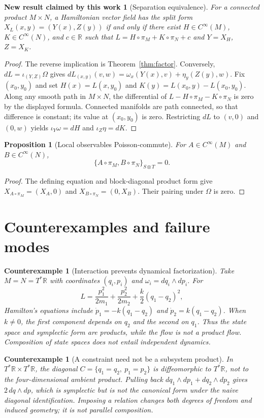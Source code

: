 \documentclass[11pt]{article}
\newtheorem{proposition}[definition]{Proposition}
\newtheorem{newresult}[definition]{New result claimed by this work}
\newtheorem{counterexample}[definition]{Counterexample}
\newcommand{\R}{\mathbb R}
\begin{document}
\begin{newresult}[Separation equivalence]
For a connected product $M\times N$, a Hamiltonian vector field has the split form
$X_L(x,y)=(Y(x),Z(y))$ if and only if there exist $H\in C^\infty(M)$, $K\in C^\infty(N)$, and $c\in\R$ such that
$L=H\circ\pi_M+K\circ\pi_N+c$ and $Y=X_H$, $Z=X_K$.
\end{newresult}
\begin{proof}
The reverse implication is Theorem~\ref{thm:factor}.  Conversely, $dL=\iota_{(Y,Z)}\Omega$ gives
$dL_{(x,y)}(v,w)=\omega_x(Y(x),v)+\eta_y(Z(y),w)$.  Fix $(x_0,y_0)$ and set
$H(x)=L(x,y_0)$ and $K(y)=L(x_0,y)-L(x_0,y_0)$.  Along any smooth path in $M\times N$, the differential of $L-H\circ\pi_M-K\circ\pi_N$ is zero by the displayed formula.  Connected manifolds are path connected, so that difference is constant; its value at $(x_0,y_0)$ is zero.  Restricting $dL$ to $(v,0)$ and $(0,w)$ yields $\iota_Y\omega=dH$ and $\iota_Z\eta=dK$.
\end{proof}

\begin{proposition}[Local observables Poisson-commute]
For $A\in C^\infty(M)$ and $B\in C^\infty(N)$,
\[
 \{A\circ\pi_M,B\circ\pi_N\}_{S\otimes T}=0.
\]
\end{proposition}
\begin{proof}
The defining equation and block-diagonal product form give
$X_{A\circ\pi_M}=(X_A,0)$ and $X_{B\circ\pi_N}=(0,X_B)$.  Their pairing under $\Omega$ is zero.
\end{proof}

\section{Counterexamples and failure modes}

\begin{counterexample}[Interaction prevents dynamical factorization]
Take $M=N=T^*\R$ with coordinates $(q_i,p_i)$ and $\omega_i=dq_i\wedge dp_i$.  For
\[
 L=\frac{p_1^2}{2m_1}+\frac{p_2^2}{2m_2}+\frac{k}{2}(q_1-q_2)^2,
\]
Hamilton's equations include $\dot p_1=-k(q_1-q_2)$ and $\dot p_2=k(q_1-q_2)$.  When $k\ne0$, the first component depends on $q_2$ and the second on $q_1$.  Thus the state space and symplectic form are products, while the flow is not a product flow.  Composition of state spaces does not entail independent dynamics.
\end{counterexample}

\begin{counterexample}[A constraint need not be a subsystem product]
In $T^*\R\times T^*\R$, the diagonal
$C=\{q_1=q_2,\ p_1=p_2\}$ is diffeomorphic to $T^*\R$, not to the four-dimensional ambient product.  Pulling back
$dq_1\wedge dp_1+dq_2\wedge dp_2$ gives $2\,dq\wedge dp$, which is symplectic but is not the canonical form under the naive diagonal identification.  Imposing a relation changes both degrees of freedom and induced geometry; it is not parallel composition.
\end{counterexample}
\end{document}
